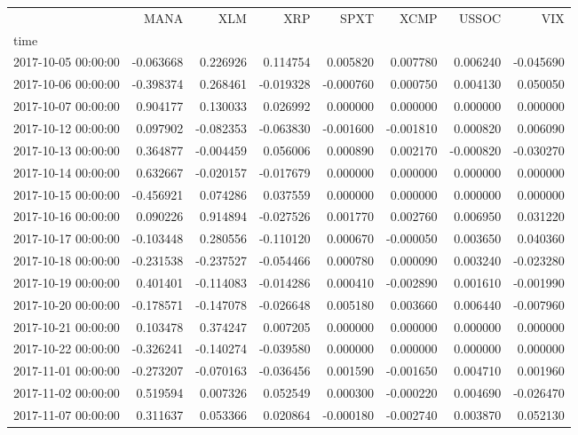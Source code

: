 \begin{tabular}{lrrrrrrr}
\toprule
 & MANA & XLM & XRP & SPXT & XCMP & USSOC & VIX \\
time &  &  &  &  &  &  &  \\
\midrule
2017-10-05 00:00:00 & -0.063668 & 0.226926 & 0.114754 & 0.005820 & 0.007780 & 0.006240 & -0.045690 \\
2017-10-06 00:00:00 & -0.398374 & 0.268461 & -0.019328 & -0.000760 & 0.000750 & 0.004130 & 0.050050 \\
2017-10-07 00:00:00 & 0.904177 & 0.130033 & 0.026992 & 0.000000 & 0.000000 & 0.000000 & 0.000000 \\
2017-10-12 00:00:00 & 0.097902 & -0.082353 & -0.063830 & -0.001600 & -0.001810 & 0.000820 & 0.006090 \\
2017-10-13 00:00:00 & 0.364877 & -0.004459 & 0.056006 & 0.000890 & 0.002170 & -0.000820 & -0.030270 \\
2017-10-14 00:00:00 & 0.632667 & -0.020157 & -0.017679 & 0.000000 & 0.000000 & 0.000000 & 0.000000 \\
2017-10-15 00:00:00 & -0.456921 & 0.074286 & 0.037559 & 0.000000 & 0.000000 & 0.000000 & 0.000000 \\
2017-10-16 00:00:00 & 0.090226 & 0.914894 & -0.027526 & 0.001770 & 0.002760 & 0.006950 & 0.031220 \\
2017-10-17 00:00:00 & -0.103448 & 0.280556 & -0.110120 & 0.000670 & -0.000050 & 0.003650 & 0.040360 \\
2017-10-18 00:00:00 & -0.231538 & -0.237527 & -0.054466 & 0.000780 & 0.000090 & 0.003240 & -0.023280 \\
2017-10-19 00:00:00 & 0.401401 & -0.114083 & -0.014286 & 0.000410 & -0.002890 & 0.001610 & -0.001990 \\
2017-10-20 00:00:00 & -0.178571 & -0.147078 & -0.026648 & 0.005180 & 0.003660 & 0.006440 & -0.007960 \\
2017-10-21 00:00:00 & 0.103478 & 0.374247 & 0.007205 & 0.000000 & 0.000000 & 0.000000 & 0.000000 \\
2017-10-22 00:00:00 & -0.326241 & -0.140274 & -0.039580 & 0.000000 & 0.000000 & 0.000000 & 0.000000 \\
2017-11-01 00:00:00 & -0.273207 & -0.070163 & -0.036456 & 0.001590 & -0.001650 & 0.004710 & 0.001960 \\
2017-11-02 00:00:00 & 0.519594 & 0.007326 & 0.052549 & 0.000300 & -0.000220 & 0.004690 & -0.026470 \\
2017-11-07 00:00:00 & 0.311637 & 0.053366 & 0.020864 & -0.000180 & -0.002740 & 0.003870 & 0.052130 \\

\end{tabular}
